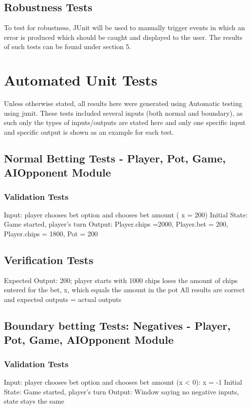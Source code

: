 \documentclass[11pt]{article}
\begin{document}
	\subsection{Robustness Tests}
	To test for robustness, JUnit will be used to manually trigger events in which an error is produced which should be caught and displayed to the user. The results of such tests can be found under section 5.
	\section{Automated Unit Tests}	
	Unless otherwise stated, all results here were generated using Automatic testing using junit. These tests included several inputs (both normal and boundary), as such only the types of inputs/outputs are stated here and only one specific input and specific output is shown as an example for each test.
	
\subsection{Normal Betting Tests - Player, Pot, Game, AIOpponent Module}
\subsubsection{Validation Tests}			
Input: player chooses bet option and chooses bet amount ( x = 200)
Initial State: Game started, player's turn
Output: Player.chips =2000, Player.bet = 200, Player.chips = 1800, Pot = 200

\subsection{Verification Tests}
Expected Output: 200; player starts with 1000 chips loses the amount of chips entered for the bet, x, which equals the amount in the pot
All results are correct and expected outputs = actual outputs

\subsection{Boundary betting Tests: Negatives - Player, Pot, Game, AIOpponent Module}

\subsubsection{Validation Tests}
Input: player chooses bet option and chooses bet amount (x < 0): x = -1
Initial State: Game started, player's turn
Output: Window saying no negative inputs, state stays the same
\end{document}

